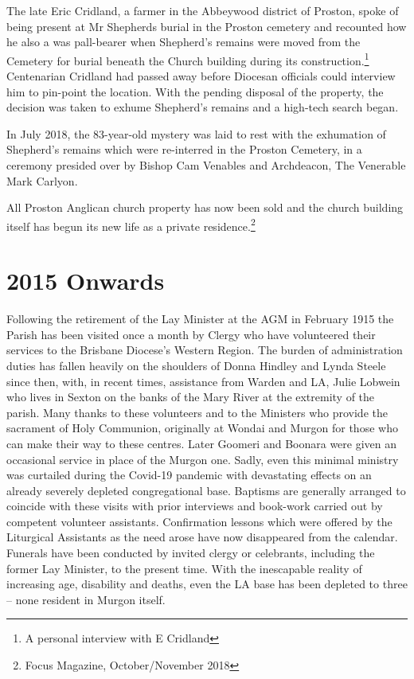 The late Eric Cridland, a farmer in the Abbeywood district of Proston, spoke of being present at Mr Shepherds burial in the Proston cemetery and recounted how he also a was pall-bearer when Shepherd's remains were moved from the Cemetery for burial beneath the Church building during its construction.\footnote{A personal interview with E Cridland} Centenarian Cridland had passed away before Diocesan officials could interview him to pin-point the location. With the pending disposal of the property, the decision was taken to exhume Shepherd's remains and a high-tech search began.


In July 2018, the 83-year-old mystery was laid to rest with the exhumation of Shepherd's remains which were re-interred in the Proston Cemetery, in a ceremony presided over by Bishop Cam Venables and Archdeacon, The Venerable Mark Carlyon.



All Proston Anglican church property has now been sold and the church building itself has begun its new life as a private residence.\footnote{Focus Magazine, October/November 2018}


\section{2015 Onwards}



Following the retirement of the Lay Minister at the AGM in February 1915 the Parish has been visited once a month by Clergy who have volunteered their services to the Brisbane Diocese's Western Region. The burden of administration duties has fallen heavily on the shoulders of Donna Hindley and Lynda Steele since then, with, in recent times, assistance from Warden and LA, Julie Lobwein who lives in Sexton on the banks of the Mary River at the extremity of the parish. Many thanks to these volunteers and to the Ministers who provide the sacrament of Holy Communion, originally at Wondai and Murgon for those who can make their way to these centres. Later Goomeri and Boonara were given an occasional service in place of the Murgon one. Sadly, even this minimal ministry was curtailed during the Covid-19 pandemic with devastating effects on an already severely depleted congregational base. Baptisms are generally arranged to coincide with these visits with prior interviews and book-work carried out by competent volunteer assistants. Confirmation lessons which were offered by the Liturgical Assistants as the need arose have now disappeared from the calendar. Funerals have been conducted by invited clergy or celebrants, including the former Lay Minister, to the present time. With the inescapable reality of increasing age, disability and deaths, even the LA base has been depleted to three -- none resident in Murgon itself.










